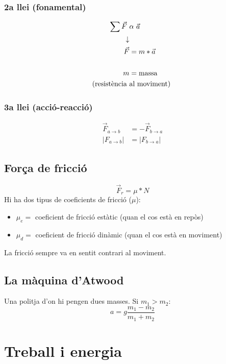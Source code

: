 \subsubsection{2a llei (fonamental)}
\begin{align}
    \sum \vec{F}\ &\alpha\ \vec{a} \notag \\
    \downarrow & \notag \\
    \vec{F} &= m * \vec{a} \\ 
    \notag \\
    m &= \text{massa} \notag \\
    \text{(resistència }&\text{al moviment) }\notag \\
\end{align}

\subsubsection{3a llei (acció-reacció)}
\begin{align*}
    \vec{F}_{a \rightarrow b} &= -\vec{F}_{b \rightarrow a} \\
    |F_{a \rightarrow b}| &= |F_{b \rightarrow a}|
\end{align*}

\subsection{Força de fricció}

\begin{equation}
    \vec{F}_r = \mu * N
\end{equation}
Hi ha dos tipus de coeficients de fricció ($\mu$):
\begin{itemize}
    \item $\mu _e = $ coeficient de fricció estàtic (quan el cos està en repòs)
    \item $\mu _d = $ coeficient de fricció dinàmic (quan el cos està en moviment)
\end{itemize}
La fricció sempre va en sentit contrari al moviment.


\subsection{La màquina d'Atwood}
Una politja d'on hi pengen dues masses. Si $m_1 > m_2$:
\begin{equation}
    a = g\frac{m_1-m_2}{m_1+m_2}
\end{equation} 

\section{Treball i energia}

